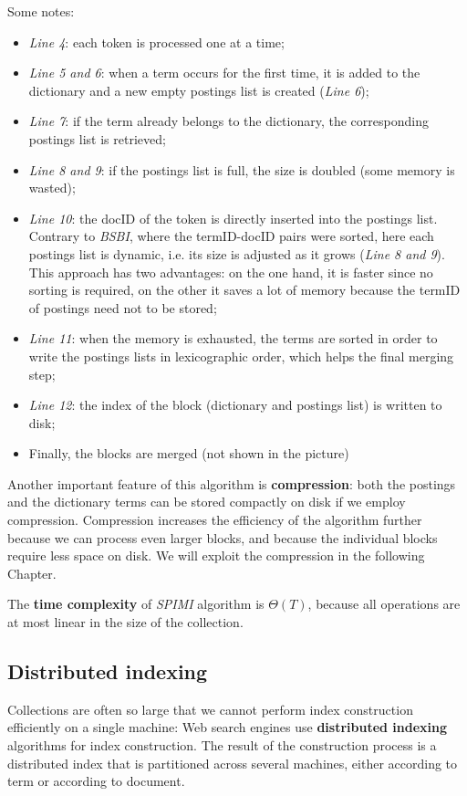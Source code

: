 Some notes:

\begin{itemize}
    \item \textit{Line 4}: each token is processed one at a time;
    \item \textit{Line 5 and 6}: when a term occurs for the first time, it is added to the dictionary and a new empty postings list is created (\textit{Line 6});
    \item \textit{Line 7}: if the term already belongs to the dictionary, the corresponding postings list is retrieved;
    \item \textit{Line 8 and 9}: if the postings list is full, the size is doubled (some memory is wasted);
    \item \textit{Line 10}: the docID of the token is directly inserted into the postings list. Contrary to \textit{BSBI}, where the termID-docID pairs were sorted, here each postings list is dynamic, i.e. its size is adjusted as it grows (\textit{Line 8 and 9}). This approach has two advantages: on the one hand, it is faster since no sorting is required, on the other it saves a lot of memory because the termID of postings need not to be stored;
    \item \textit{Line 11}: when the memory is exhausted, the terms are sorted in order to write the postings lists in lexicographic order, which helps the final merging step;
    \item \textit{Line 12}: the index of the block (dictionary and postings list) is written to disk;
    \item Finally, the blocks are merged (not shown in the picture)
\end{itemize}

Another important feature of this algorithm is \textbf{compression}: both the postings and the dictionary terms can be stored compactly on disk if we employ compression. Compression increases the efficiency of the algorithm further because we can process even larger blocks, and because the individual blocks require less space on disk. We will exploit the compression in the following Chapter. 

The \textbf{time complexity} of \textit{SPIMI} algorithm is $\Theta(T)$, because all operations are at most linear in the size of the collection.

\subsection{Distributed indexing}
Collections are often so large that we cannot perform index construction efficiently on a single machine: Web search engines use \textbf{distributed indexing} algorithms for index construction. The result of the construction process is a distributed index that is partitioned across several machines, either according to term or according to document.


